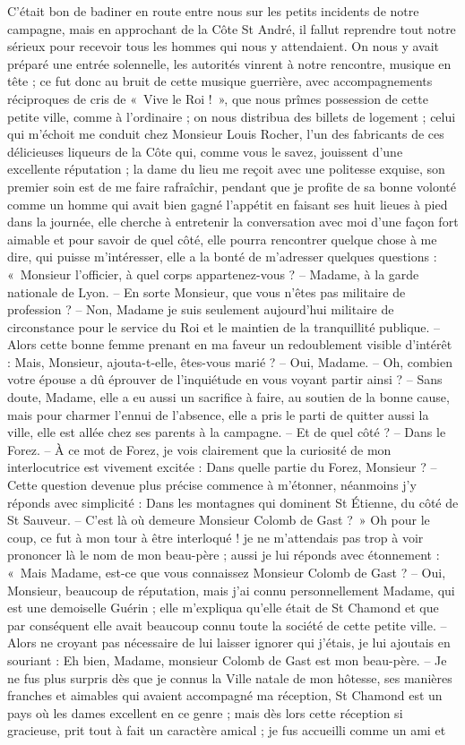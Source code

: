 \documentclass[11pt,a4paper]{report}
\begin{document}
C'était bon de badiner en route entre nous sur les petits incidents de notre campagne, mais en approchant de la Côte St André, il fallut reprendre tout notre sérieux pour recevoir tous les hommes qui nous y attendaient. On nous y avait préparé une entrée solennelle, les autorités vinrent à notre rencontre, musique en tête ; ce fut donc au bruit de cette musique guerrière, avec accompagnements réciproques de cris de «~Vive le Roi !~», que nous prîmes possession de cette petite ville, comme à l'ordinaire ; on nous distribua des billets de logement ; celui qui m'échoit me conduit chez Monsieur Louis Rocher, l'un des fabricants de ces délicieuses liqueurs de la Côte qui, comme vous le savez, jouissent d'une excellente réputation ; la dame du lieu me reçoit avec une politesse exquise, son premier soin est de me faire rafraîchir, pendant que je profite de sa bonne volonté comme un homme qui avait bien gagné l'appétit en faisant ses huit lieues à pied dans la journée, elle cherche à entretenir la conversation avec moi d'une façon fort aimable et pour savoir de quel côté, elle pourra rencontrer quelque chose à me dire, qui puisse m'intéresser, elle a la bonté de m'adresser quelques questions : «~Monsieur l'officier, à quel corps appartenez-vous ? -- Madame, à la garde nationale de Lyon. -- En sorte Monsieur, que vous n'êtes pas militaire de profession ? -- Non, Madame je suis seulement aujourd'hui militaire de circonstance pour le service du Roi et le maintien de la tranquillité publique. -- Alors cette bonne femme prenant en ma faveur un redoublement visible d'intérêt : Mais, Monsieur, ajouta-t-elle, êtes-vous marié ? -- Oui, Madame. -- Oh, combien votre épouse a dû éprouver de l'inquiétude en vous voyant partir ainsi ? -- Sans doute, Madame, elle a eu aussi un sacrifice à faire, au soutien de la bonne cause, mais pour charmer l'ennui de l'absence, elle a pris le parti de quitter aussi la ville, elle est allée chez ses parents à la campagne. -- Et de quel côté ? -- Dans le Forez. -- À ce mot de Forez, je vois clairement que la curiosité de mon interlocutrice est vivement excitée : Dans quelle partie du Forez, Monsieur ? -- Cette question devenue plus précise commence à m'étonner, néanmoins j'y réponds avec simplicité : Dans les montagnes qui dominent St Étienne, du côté de St Sauveur. -- C'est là où demeure Monsieur Colomb de Gast ?~» Oh pour le coup, ce fut à mon tour à être interloqué ! je ne m'attendais pas trop à voir prononcer là le nom de mon beau-père ; aussi je lui réponds avec étonnement : «~Mais Madame, est-ce que vous connaissez Monsieur Colomb de Gast ? -- Oui, Monsieur, beaucoup de réputation, mais j'ai connu personnellement Madame, qui est une demoiselle Guérin ; elle m'expliqua qu'elle était de St Chamond et que par conséquent elle avait beaucoup connu toute la société de cette petite ville. -- Alors ne croyant pas nécessaire de lui laisser ignorer qui j'étais, je lui ajoutais en souriant : Eh bien, Madame, monsieur Colomb de Gast est mon beau-père. -- Je ne fus plus surpris dès que je connus la Ville natale de mon hôtesse, ses manières franches et aimables qui avaient accompagné ma réception, St Chamond est un pays où les dames excellent en ce genre ; mais dès lors cette réception si gracieuse, prit tout à fait un caractère amical ; je fus accueilli comme un ami et 
\end{document}
